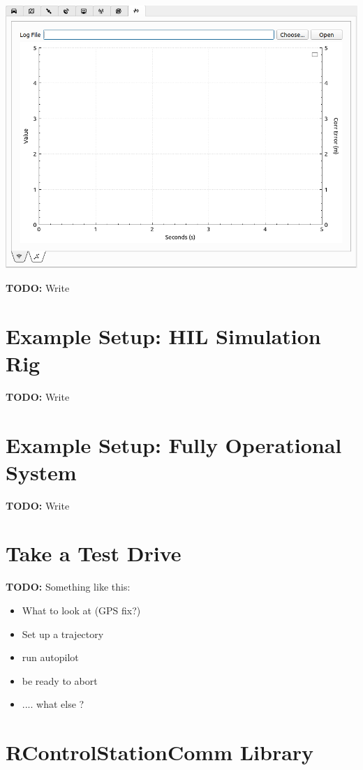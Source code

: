 \documentclass[12pt]{article} %
\newcommand{\todo}[1]{{\color{red} \textbf{TODO:} #1}}
\begin{document}
\noindent \includegraphics[width=\textwidth]{./screens/Log3.png}

\todo{Write}

\section{Example Setup: HIL Simulation Rig}

\todo{Write}

\section{Example Setup: Fully Operational System}

\todo{Write}

\section{Take a Test Drive}

\todo{Something like this:}
\begin{itemize}
\item What to look at (GPS fix?)
\item Set up a trajectory
\item run autopilot
\item be ready to abort
\item .... what else ? 
\end{itemize} 





\section{RControlStationComm Library}
\end{document}
